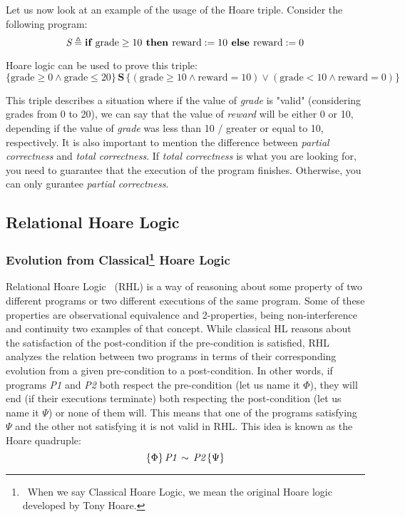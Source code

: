 Let us now look at an example of the usage of the Hoare triple. Consider the following program:
\[ 
\emph{S} \triangleq \textbf{if } \text{grade} \geq 10 \textbf{ then } \text{reward} := 10 \textbf{ else } \text{reward} := 0 
\]

Hoare logic can be used to prove this triple:
\[
\{ \text{grade} \geq 0 \land \text{grade} \leq 20 \} \, \textbf{S} \, \{ (\text{grade} \geq 10 \land \text{reward} = 10) \lor (\text{grade} < 10 \land \text{reward} = 0) \}
\]

This triple describes a situation where if the value of \emph{grade} is "valid" (considering grades from 0 to 20), we can say that the value of \emph{reward} will be either 0 or 10, depending if the value of \emph{grade} was less than 10 / greater or equal to 10, respectively.
It is also important to mention the difference between \emph{partial correctness} and \emph{total correctness}.
If \emph{total correctness} is what you are looking for, you need to guarantee that the execution of the program finishes.
Otherwise, you can only gurantee \emph{partial correctness}.


\subsection{Relational Hoare Logic} 
\label{sub:relational_hoare_logic}

\subsubsection{Evolution from Classical\protect\footnote{\ When we say Classical Hoare Logic, we mean the original Hoare logic developed by Tony Hoare.} Hoare Logic}
\label{sub:relational_hoare_logic_motivation}

Relational Hoare Logic~\cite{naumann2022thirtysevenyearsrelationalhoare, DBLP:conf/popl/Benton04} (RHL) is a way of reasoning about some property of two different programs or two different executions of the same program.
Some of these properties are observational equivalence and 2-properties, being non-interference and continuity two examples of that concept.
While classical HL reasons about the satisfaction of the post-condition if the pre-condition is satisfied, RHL analyzes the relation between two programs in terms of their corresponding evolution from a given pre-condition to a post-condition.
In other words, if programs \emph{P1} and \emph{P2} both respect the pre-condition (let us name it $\Phi$), they will end (if their executions terminate) both respecting the post-condition (let us name it $\Psi$) or none of them will.
This means that one of the programs satisfying $\Psi$ and the other not satisfying it is not valid in RHL.
This idea is known as the Hoare quadruple:
\[ \{\Phi\} \, \emph{P1} \, \sim \, \emph{P2} \, \{\Psi\} \]

